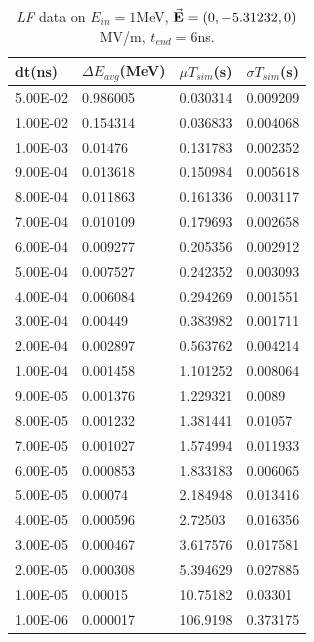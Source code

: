 \documentclass[a4paper,oneside,12pt]{report}
\numberwithin{equation}{chapter}
\begin{document}
\begin{table}[H]
    \centering
    \caption{\textit{LF} data on $E_{in}=1$MeV, $\vec{\textbf{E}}=(0, -5.31232, 0)$ MV/m, $t_{end}=6$ns.}
    \vspace{10pt}
    \begin{tabular}{|l|l|l|l|}
    \hline
    dt(ns)       & $\Delta E_{avg}$(MeV) & $\mu T_{sim}$(s)    & $\sigma T_{sim}$(s) \\\hline
    5.00E-02 & 0.986005     & 0.030314 & 0.009209 \\\hline
    1.00E-02 & 0.154314     & 0.036833 & 0.004068 \\\hline
    1.00E-03 & 0.01476      & 0.131783 & 0.002352 \\\hline
    9.00E-04 & 0.013618     & 0.150984 & 0.005618 \\\hline
    8.00E-04 & 0.011863     & 0.161336 & 0.003117 \\\hline
    7.00E-04 & 0.010109     & 0.179693 & 0.002658 \\\hline
    6.00E-04 & 0.009277     & 0.205356 & 0.002912 \\\hline
    5.00E-04 & 0.007527     & 0.242352 & 0.003093 \\\hline
    4.00E-04 & 0.006084     & 0.294269 & 0.001551 \\\hline
    3.00E-04 & 0.00449      & 0.383982 & 0.001711 \\\hline
    2.00E-04 & 0.002897     & 0.563762 & 0.004214 \\\hline
    1.00E-04 & 0.001458     & 1.101252 & 0.008064 \\\hline
    9.00E-05 & 0.001376     & 1.229321 & 0.0089   \\\hline
    8.00E-05 & 0.001232     & 1.381441 & 0.01057  \\\hline
    7.00E-05 & 0.001027     & 1.574994 & 0.011933 \\\hline
    6.00E-05 & 0.000853     & 1.833183 & 0.006065 \\\hline
    5.00E-05 & 0.00074      & 2.184948 & 0.013416 \\\hline
    4.00E-05 & 0.000596     & 2.72503  & 0.016356 \\\hline
    3.00E-05 & 0.000467     & 3.617576 & 0.017581 \\\hline
    2.00E-05 & 0.000308     & 5.394629 & 0.027885 \\\hline
    1.00E-05 & 0.00015      & 10.75182 & 0.03301  \\\hline
    1.00E-06 & 0.000017     & 106.9198 & 0.373175 \\\hline
    \end{tabular}
    \label{tab:lf_statE90_table}
\end{table}
\end{document}
